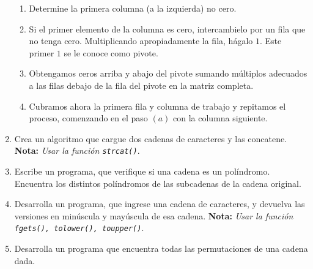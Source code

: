 \documentclass[11pt,a4paper]{article}
\newcounter{num}
\begin{document}
\begin{enumerate}
\begin{enumerate}
\item  Determine la primera columna (a la izquierda) no cero.
\item  Si el primer elemento de la columna es cero, intercambielo por un fila que no tenga cero. Multiplicando apropiadamente la fila, h\'agalo $1$. Este primer $1$ se le conoce como pivote.
\item  Obtengamos ceros arriba y abajo del pivote sumando m\'ultiplos adecuados a las filas debajo de la fila del pivote en la matriz completa.
\item Cubramos ahora la primera fila y columna de trabajo y repitamos el proceso, \mbox{comenzando} en el paso $(a)$ con la columna siguiente.
\end{enumerate}
\item Crea un algoritmo que cargue dos cadenas de caracteres y las concatene. \textbf{Nota:} \textit{Usar la funci\'on \texttt{strcat()}}.
\item Escribe un programa, que verifique si una cadena es un pol\'indromo. Encuentra los distintos pol\'indromos de las subcadenas de la cadena original.
\item Desarrolla un programa, que ingrese una cadena de caracteres, y devuelva las versiones en min\'uscula y may\'uscula de esa cadena. \textbf{Nota:} \textit{Usar la funci\'on \texttt{ fgets(), tolower(), toupper()}}.
\item Desarrolla un programa que encuentra todas las permutaciones de una cadena dada. 

\end{enumerate}
\end{document}

